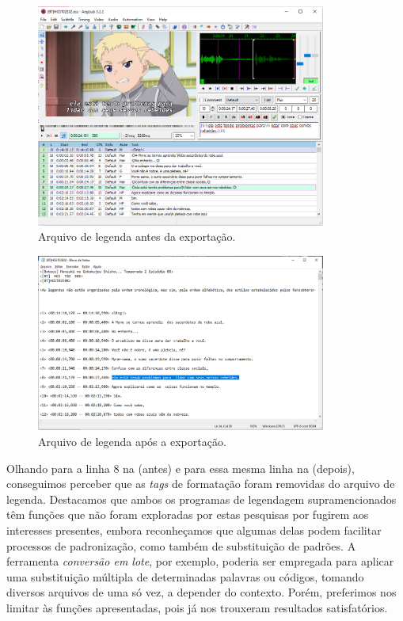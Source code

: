 \documentclass[portuguese]{textolivre}
\begin{document}
\begin{figure}[htbp]
 \centering
 \includegraphics[width=0.85\textwidth]{Fig26.png}
 \caption{Arquivo de legenda antes da exportação.}
 \label{fig26}
\end{figure}

\begin{figure}[htbp]
 \centering
 \includegraphics[width=0.85\textwidth]{Fig27.png}
 \caption{Arquivo de legenda após a exportação.}
 \label{fig27}
\end{figure}

Olhando para a linha 8 na  (antes) e para essa mesma linha na  (depois), conseguimos perceber que as \textit{tags} de formatação foram removidas do arquivo de legenda. Destacamos que ambos os programas de legendagem supramencionados têm funções que não foram exploradas por estas pesquisas por fugirem aos interesses presentes, embora reconheçamos que algumas delas podem facilitar processos de padronização, como também de substituição de padrões. A ferramenta \textit{conversão em lote}, por exemplo, poderia ser empregada para aplicar uma substituição múltipla de determinadas palavras ou códigos, tomando diversos arquivos de uma só vez, a depender do contexto. Porém, preferimos nos limitar às funções apresentadas, pois já nos trouxeram resultados satisfatórios. 
\end{document}

